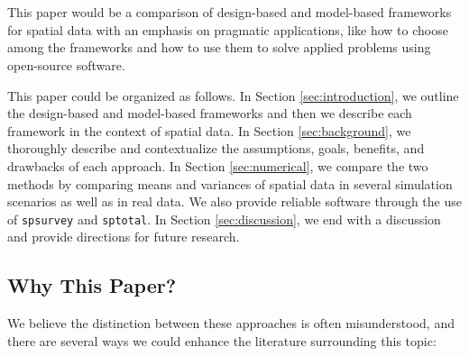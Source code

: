 




\maketitle

\linenumbers

\clearpage

% 

\clearpage

\section*{}

This paper would be a comparison of design-based and model-based frameworks for spatial data with an emphasis on pragmatic applications, like how to choose among the frameworks and how to use them to solve applied problems using open-source software.

This paper could be organized as follows. In Section \ref{sec:introduction}, we outline the design-based and model-based frameworks and then we describe each framework in the context of spatial data. In Section \ref{sec:background}, we thoroughly describe and contextualize the assumptions, goals, benefits, and drawbacks of each approach. In Section \ref{sec:numerical}, we compare the two methods by comparing means and variances of spatial data in several simulation scenarios as well as in real data. We also provide reliable software through the use of \texttt{spsurvey} and \texttt{sptotal}. In Section \ref{sec:discussion}, we end with a discussion and provide directions for future research.

\subsection*{Why This Paper?}

We believe the distinction between these approaches is often misunderstood, and there are several ways we could enhance the literature surrounding this topic:

